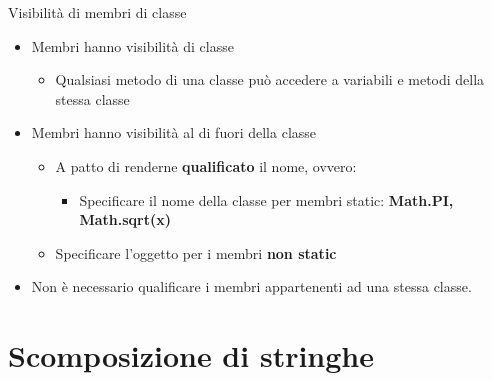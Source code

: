 \begin{frame}
\begin{block}{Visibilità di membri di classe}
\begin{itemize}
\item Membri \textbf{} hanno visibilità di classe
\begin{itemize}
\item Qualsiasi metodo di una classe può accedere a variabili e metodi della stessa classe
\end{itemize}
\item Membri \textbf{} hanno visibilità al di fuori della classe
\begin{itemize}
\item A patto di renderne \textbf{\alert{qualificato}} il nome, ovvero:
\begin{itemize}
\item Specificare il nome della classe per membri static: \textbf{Math.PI, Math.sqrt(x)}
\end{itemize}
\item Specificare l'oggetto per i membri \textbf{non static}
\end{itemize}
\item Non è necessario qualificare i membri appartenenti ad una stessa classe.
\end{itemize}
\end{block}
\end{frame}


\section*{Scomposizione di stringhe}
\begin{frame}
\begin{block}{}
\begin{huge}
\begin{center}
\end{center}
\end{huge}
\end{block}
\end{frame}

